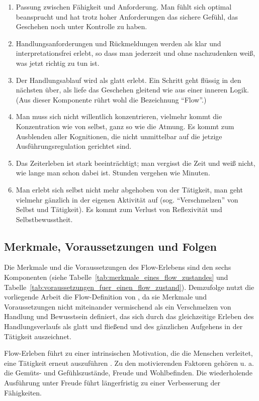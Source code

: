 \begin{enumerate}
\item Passung zwischen Fähigkeit und Anforderung. Man fühlt sich optimal beansprucht und hat trotz hoher Anforderungen das sichere Gefühl, das Geschehen noch unter Kontrolle zu haben.
\item Handlungsanforderungen und Rückmeldungen werden als klar und interpretationsfrei erlebt, so dass man jederzeit und ohne nachzudenken weiß, was jetzt richtig zu tun ist.
\item Der Handlungsablauf wird als glatt erlebt. Ein Schritt geht flüssig in den nächsten über, als liefe das Geschehen gleitend wie aus einer inneren Logik. (Aus dieser Komponente rührt wohl die Bezeichnung "`Flow"'.)
\item Man muss sich nicht willentlich konzentrieren, vielmehr kommt die Konzentration wie von selbst, ganz so wie die Atmung. Es kommt zum Ausblenden aller Kognitionen, die nicht unmittelbar auf die jetzige Ausführungsregulation gerichtet sind.
\item Das Zeiterleben ist stark beeinträchtigt; man vergisst die Zeit und weiß nicht, wie lange man schon dabei ist. Stunden vergehen wie Minuten.
\item Man erlebt sich selbst nicht mehr abgehoben von der Tätigkeit, man geht vielmehr gänzlich in der eigenen Aktivität auf (sog. "`Verschmelzen"' von Selbst und Tätigkeit). Es kommt zum Verlust von Reflexivität und Selbstbewusstheit.
\end{enumerate}

\subsection{Merkmale, Voraussetzungen und Folgen}
\label{sub:merkmale_voraussetzungen_und_folgen}
Die Merkmale und die Voraussetzungen des Flow-Erlebens sind den sechs Komponenten (siehe Tabelle~\ref{tab:merkmale_eines_flow_zustandes} und Tabelle~\ref{tab:voraussetzungen_fuer_einen_flow_zustand}). Demzufolge nutzt die vorliegende Arbeit die Flow-Definition von \citet{Henk2014}, da sie Merkmale und Voraussetzungen nicht miteinander vermischend als ein Verschmelzen von Handlung und Bewusstsein definiert, das sich durch das gleichzeitige Erleben des Handlungsverlaufs als glatt und fließend und des gänzlichen Aufgehens in der Tätigkeit auszeichnet.

Flow-Erleben führt zu einer intrinsischen Motivation, die die Menschen verleitet, eine Tätigkeit erneut auszuführen \citep[vgl.][S.~602]{Csikszentmihalyi2005}. Zu den motivierenden Faktoren gehören u. a. die Gemüts- und Gefühlszustände, Freude und Wohlbefinden. Die wiederholende Ausführung unter Freude führt längerfristig zu einer Verbesserung der Fähigkeiten.


